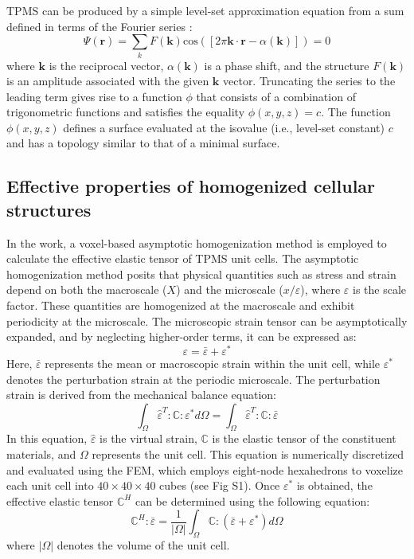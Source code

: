 \documentclass[preprint,review,12pt,authoryear]{elsarticle}
\begin{document}
TPMS can be produced by a simple level-set approximation equation from a sum defined in terms of the Fourier series \citep{Gandy2001,Al-Ketan2019}:
\begin{equation}
 \Psi(\boldsymbol{r})=\sum_kF(\boldsymbol{k})\text{cos}([2\pi \boldsymbol{k}\cdot \boldsymbol{r}-\alpha(\boldsymbol{k})])=0
\label{eq:1}
\end{equation}
where $\boldsymbol{k}$ is the reciprocal vector, $\alpha(\boldsymbol{k})$ is a phase shift, and the structure $F(\boldsymbol{k})$ is an amplitude associated with the given $\boldsymbol{k}$ vector. Truncating the series to the leading term gives rise to a function $\phi$ that consists of a combination of trigonometric functions and satisfies the equality $\phi(x,y,z)=c$. The function $\phi(x, y, z)$ defines a surface evaluated at the isovalue (i.e., level-set constant) $c$ and has a topology similar to that of a minimal surface. 

\subsection{Effective properties of homogenized cellular structures}
\label{subsec:homo}

In the work, a voxel-based asymptotic homogenization method \citep{Dong2019} is employed to calculate the effective elastic tensor of TPMS unit cells. The asymptotic homogenization method posits that physical quantities such as stress and strain depend on both the macroscale ($X$) and the microscale ($x/\varepsilon$), where $\varepsilon$ is the scale factor. These quantities are homogenized at the macroscale and exhibit periodicity at the microscale. The microscopic strain tensor can be asymptotically expanded, and by neglecting higher-order terms, it can be expressed as:
\begin{equation}
    \varepsilon = \bar{\varepsilon} + \varepsilon^{*}
\label{eq:2}
\end{equation}
Here, $\bar{\varepsilon}$ represents the mean or macroscopic strain within the unit cell, while $\varepsilon^{*}$ denotes the perturbation strain at the periodic microscale. The perturbation strain is derived from the mechanical balance equation:
\begin{equation}
\int_{\Omega}\hat{\varepsilon}^T:\mathbb{C}:\varepsilon^{*}d\Omega = \int_{\Omega}\hat{\varepsilon}^T:\mathbb{C}:\bar{\varepsilon}
\label{eq:3}
\end{equation}
In this equation, $\hat{\varepsilon}$ is the virtual strain, $\mathbb{C}$ is the elastic tensor of the constituent materials, and $\Omega$ represents the unit cell. This equation is numerically discretized and evaluated using the FEM, which employs eight-node hexahedrons to voxelize each unit cell into $40 \times 40 \times 40$ cubes (see Fig S1). Once $\varepsilon^{*}$ is obtained, the effective elastic tensor $\mathbb{C}^H$ can be determined using the following equation:
\begin{equation}
\mathbb{C}^H:\bar{\varepsilon} = \frac{1}{|\Omega|}\int_{\Omega}\mathbb{C}:(\bar{\varepsilon}+\varepsilon^{*})d\Omega
    \label{eq:4}
\end{equation}
where $|\Omega|$ denotes the volume of the unit cell.
\end{document}
